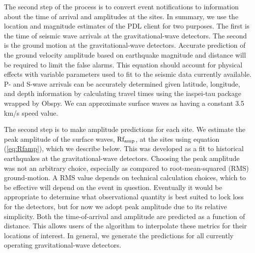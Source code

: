 \documentclass[reprint, prl, aps, showpacs]{revtex4-1}
\begin{document}
The second step of the process is to convert event notifications to information about the time of arrival and amplitudes at the sites.
In summary, we use the location and magnitude estimates of the PDL client for two purposes. 
The first is the time of seismic wave arrivals at the gravitational-wave detectors.
The second is the ground motion at the gravitational-wave detectors.
Accurate prediction of the ground velocity amplitude based on earthquake magnitude and distance will be required to limit the false alarms. 
This equation should account for physical effects with variable parameters used to fit to the seismic data currently available.
P- and S-wave arrivals can be accurately determined given latitude, longitude, and depth information by calculating travel times using the iaspei-tau package \cite{Snoke2009} wrapped by Obspy. We can approximate surface waves as having a constant 3.5\,km/s speed value. 

The second step is to make amplitude predictions for each site. We estimate the peak amplitude of the surface waves, $\rm Rf_{amp}$, at the sites using equation (\ref{eq:Rfamp}), which we describe below. This was developed as a fit to historical earthquakes at the gravitational-wave detectors. Choosing the peak amplitude was not an arbitrary choice, especially as compared to root-mean-squared (RMS) ground-motion. A RMS value depends on technical calculation choices, which to be effective will depend on the event in question. Eventually it would be appropriate to determine what observational quantity is best suited to lock loss for the detectors, but for now we adopt peak amplitude due to its relative simplicity. Both the time-of-arrival and amplitude are predicted as a function of distance. This allows users of the algorithm to interpolate these metrics for their locations of interest. In general, we generate the predictions for all currently operating gravitational-wave detectors.
\end{document}
